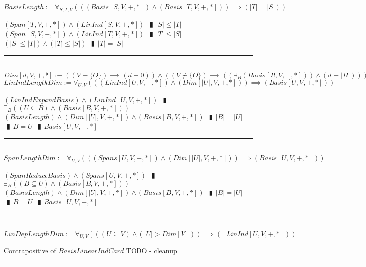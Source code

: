 \documentclass{book}
\newcommand{\abr}{:=}
\newcommand{\pipe}{$\phantom{(}\vrectangleblack\phantom{)}$}
\newcommand{\pr}[1]{\left(#1\right)}
\begin{document}
$BasisLength \abr \forall_{S, T, V}\pr{\pr{(Basis[S, V, +, *]) \land (Basis[T, V, +, *])} \implies (|T| = |S|)}$
\begin{enumerate}
  \lit $(Span[T, V, +, *]) \land (LinInd[S, V, +, *])$ \pipe $|S| \leq |T|$
  \lit $(Span[S, V, +, *]) \land (LinInd[T, V, +, *])$ \pipe $|T| \leq |S|$
  \lit $(|S| \leq |T|) \land (|T| \leq |S|)$ \pipe $|T| = |S|$
\end{enumerate} \vspace{.75mm} \hrule \vspace{.75mm} \ \\ 

$Dim[d, V, +, *] \abr \pr{(V = \{O\}) \implies (d = 0)} \land  \pr{(V \neq \{O\}) \implies \pr{\pr{\exists_{B}(Basis[B, V, +, *])} \land (d = |B|)}}$ \\

$LinIndLengthDim \abr \forall_{U, V}\pr{\pr{(LinInd[U, V, +, *]) \land (Dim[|U|, V, +, *])} \implies (Basis[U, V, +, *])}$
\begin{enumerate}
  \lit $(LinIndExpandBasis) \land (LinInd[U, V, +, *])$ \pipe $\exists_{B}\pr{(U \subseteq B) \land (Basis[B, V, +, *])}$
  \lit $(BasisLength) \land (Dim[|U|, V, +, *]) \land (Basis[B, V, +, *])$ \pipe $|B| = |U|$ \pipe $B = U$ \pipe $Basis[U, V, +, *]$
\end{enumerate} \vspace{.75mm} \hrule \vspace{.75mm} \ \\ 

$SpanLengthDim \abr \forall_{U, V}\pr{\pr{(Spans[U, V, +, *]) \land (Dim[|U|, V, +, *])} \implies (Basis[U, V, +, *])}$
\begin{enumerate}
  \lit $(SpanReduceBasis) \land (Spans[U, V, +, *])$ \pipe $\exists_{B}\pr{(B \subseteq U) \land (Basis[B, V, +, *])}$
  \lit $(BasisLength) \land (Dim[|U|, V, +, *]) \land (Basis[B, V, +, *])$ \pipe $|B| = |U|$ \pipe $B = U$ \pipe $Basis[U, V, +, *]$
\end{enumerate} \vspace{.75mm} \hrule \vspace{.75mm} \ \\ 

$LinDepLengthDim \abr \forall_{U, V}\pr{\pr{(U \subseteq V) \land (|U| > Dim[V])} \implies (\lnot LinInd[U, V, +, *])}$
\begin{enumerate}
  \lit Contrapositive of $BasisLinearIndCard$
  \lit TODO - cleanup
\end{enumerate} \vspace{.75mm} \hrule \vspace{.75mm} \ \\ 
\end{document}
